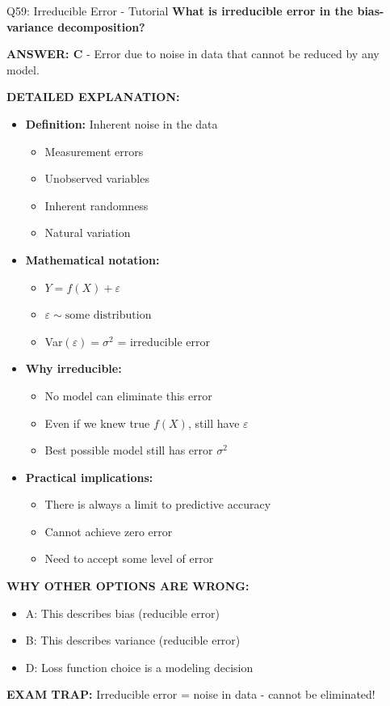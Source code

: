 \documentclass[8pt]{beamer}
\begin{document}
	\begin{frame}{Q59: Irreducible Error - Tutorial}
		\fontsize{6.5}{7.5}\selectfont
		\textbf{What is irreducible error in the bias-variance decomposition?}
		
		\vspace{0.05cm}
		\textcolor{myblue}{\textbf{ANSWER: C}} - Error due to noise in data that cannot be reduced by any model.
		
		\vspace{0.05cm}
		\textbf{DETAILED EXPLANATION:}
		\begin{itemize}
			\item \textbf{Definition:} Inherent noise in the data
			\begin{itemize}
				\item Measurement errors
				\item Unobserved variables
				\item Inherent randomness
				\item Natural variation
			\end{itemize}
			\item \textbf{Mathematical notation:}
			\begin{itemize}
				\item $Y = f(X) + \varepsilon$
				\item $\varepsilon \sim \text{some distribution}$
				\item Var$(\varepsilon) = \sigma^2$ = irreducible error
			\end{itemize}
			\item \textbf{Why irreducible:}
			\begin{itemize}
				\item No model can eliminate this error
				\item Even if we knew true $f(X)$, still have $\varepsilon$
				\item Best possible model still has error $\sigma^2$
			\end{itemize}
			\item \textbf{Practical implications:}
			\begin{itemize}
				\item There is always a limit to predictive accuracy
				\item Cannot achieve zero error
				\item Need to accept some level of error
			\end{itemize}
		\end{itemize}
		
		\vspace{0.05cm}
		\textcolor{myred}{\textbf{WHY OTHER OPTIONS ARE WRONG:}}
		\begin{itemize}
			\item \textcolor{myred}{A:} This describes bias (reducible error)
			\item \textcolor{myred}{B:} This describes variance (reducible error)
			\item \textcolor{myred}{D:} Loss function choice is a modeling decision
		\end{itemize}
		
		\textcolor{myred}{\textbf{EXAM TRAP:}} Irreducible error = noise in data - cannot be eliminated!
	\end{frame}
	
\end{document}
